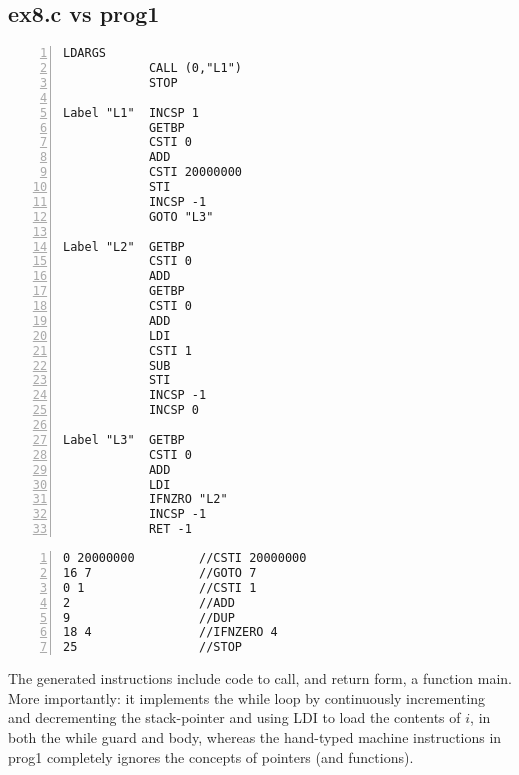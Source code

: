 \documentclass[a4paper, titlepage]{article}
\begin{document}
\subsection*{ex8.c vs prog1}
\begin{lstlisting}[numbers=left, title=ex8.c]
            LDARGS
            CALL (0,"L1")
            STOP

Label "L1"  INCSP 1
            GETBP
            CSTI 0
            ADD
            CSTI 20000000
            STI
            INCSP -1
            GOTO "L3"

Label "L2"  GETBP
            CSTI 0
            ADD
            GETBP
            CSTI 0
            ADD
            LDI
            CSTI 1
            SUB
            STI
            INCSP -1
            INCSP 0

Label "L3"  GETBP
            CSTI 0
            ADD
            LDI
            IFNZRO "L2"
            INCSP -1
            RET -1
\end{lstlisting}
\begin{lstlisting}[numbers=left, title=prog1]
0 20000000         //CSTI 20000000
16 7               //GOTO 7
0 1                //CSTI 1
2                  //ADD
9                  //DUP
18 4               //IFNZERO 4
25                 //STOP
\end{lstlisting}
The generated instructions include code to call, and return
form, a function main. More importantly: it implements the
while loop by continuously incrementing and decrementing the stack-pointer and
using LDI to load the contents of $i$, in both the while guard and body,
whereas the hand-typed machine instructions in prog1 completely ignores the
concepts of pointers (and functions).
\end{document}
